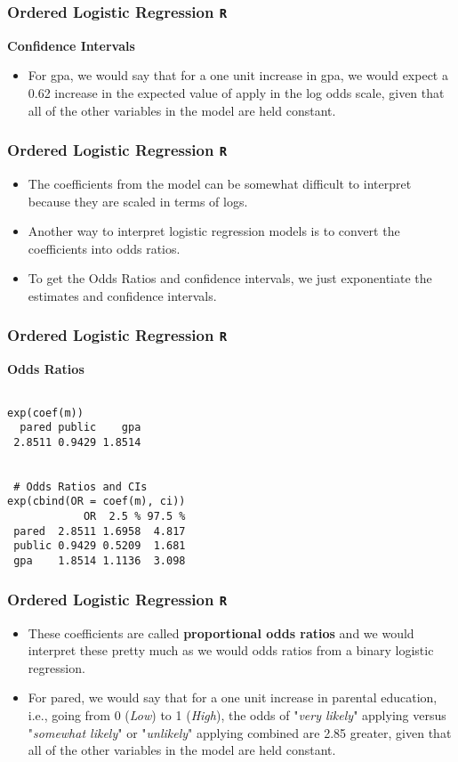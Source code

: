 \documentclass[00-GLMregslides.tex]{subfiles}
\begin{document}
\begin{frame}
		\frametitle{Ordered Logistic Regression \texttt{R} }
		\Large
\textbf{Confidence Intervals}
\begin{itemize}
\item For gpa, we would say that for a one unit increase in gpa, we would expect a 0.62 increase in the expected value of 
apply in the log odds scale, given that all of the other variables in the model are held constant.
\end{itemize}
\end{frame}
\begin{frame}
	\frametitle{Ordered Logistic Regression \texttt{R} }
	\Large
\begin{itemize}
\item  The coefficients from the model can be somewhat difficult to interpret because they are scaled in terms of logs. 
\item Another way to interpret logistic regression models is to convert the coefficients into odds ratios. 
\item To get the Odds Ratios and confidence intervals, we just exponentiate the estimates and confidence intervals.
\end{itemize}
\end{frame}
\begin{frame}[fragile]
		\frametitle{Ordered Logistic Regression \texttt{R} }
		\large
\textbf{Odds Ratios}
	\begin{verbatim}

exp(coef(m))
  pared public    gpa 
 2.8511 0.9429 1.8514
 
 
 # Odds Ratios and CIs
exp(cbind(OR = coef(m), ci))
            OR  2.5 % 97.5 %
 pared  2.8511 1.6958  4.817
 public 0.9429 0.5209  1.681
 gpa    1.8514 1.1136  3.098
\end{verbatim}
\end{frame}
\begin{frame}
		\frametitle{Ordered Logistic Regression \texttt{R} }
		\Large
\begin{itemize}
\item These coefficients are called \textbf{proportional odds ratios} and we would interpret these pretty much as 
we would odds ratios from a binary logistic regression. 
\item For pared, we would say that for a one unit increase in parental education, i.e., going from 0 (\textit{Low}) to 1 (\textit{High}), 
the odds of "\textit{very likely}" applying versus "\textit{somewhat likely}" or "\textit{unlikely}" applying combined are 2.85 greater, 
given that all of the other variables in the model are held constant. 
\end{itemize}
\end{frame}
\end{document}
